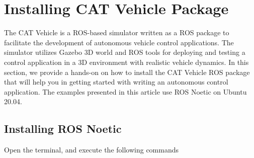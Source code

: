 \documentclass[
]{article}
\newenvironment{Shaded}{\begin{snugshade}}{\end{snugshade}}
\newcommand{\AttributeTok}[1]{\textcolor[rgb]{0.77,0.63,0.00}{#1}}
\newcommand{\BuiltInTok}[1]{#1}
\newcommand{\CommentTok}[1]{\textcolor[rgb]{0.56,0.35,0.01}{\textit{#1}}}
\newcommand{\DataTypeTok}[1]{\textcolor[rgb]{0.13,0.29,0.53}{#1}}
\newcommand{\ExtensionTok}[1]{#1}
\newcommand{\FunctionTok}[1]{\textcolor[rgb]{0.00,0.00,0.00}{#1}}
\newcommand{\KeywordTok}[1]{\textcolor[rgb]{0.13,0.29,0.53}{\textbf{#1}}}
\newcommand{\NormalTok}[1]{#1}
\newcommand{\OperatorTok}[1]{\textcolor[rgb]{0.81,0.36,0.00}{\textbf{#1}}}
\newcommand{\StringTok}[1]{\textcolor[rgb]{0.31,0.60,0.02}{#1}}
\begin{document}
\hypertarget{installing-cat-vehicle-package}{%
\section{Installing CAT Vehicle
Package}\label{installing-cat-vehicle-package}}

\label{sec:install_ros} The CAT Vehicle is a ROS-based simulator written
as a ROS package to facilitate the development of autonomous vehicle
control applications. The simulator utilizes Gazebo 3D world and ROS
tools for deploying and testing a control application in a 3D
environment with realistic vehicle dynamics. In this section, we provide
a hands-on on how to install the CAT Vehicle ROS package that will help
you in getting started with writing an autonomous control application.
The examples presented in this article use ROS Noetic on Ubuntu 20.04.

\hypertarget{installing-ros-noetic}{%
\subsection{Installing ROS Noetic}\label{installing-ros-noetic}}

Open the terminal, and execute the following commands

\begin{Shaded}
\end{Shaded}
\end{document}
